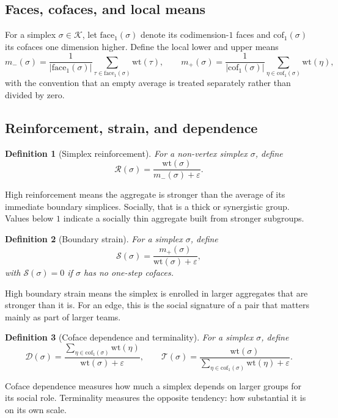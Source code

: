 \documentclass[11pt]{article}
\newtheorem{definition}{Definition}[section]
\newcommand{\eps}{\varepsilon}
\newcommand{\K}{\mathcal{K}}
\newcommand{\wt}{\mathrm{wt}}
\newcommand{\cof}{\mathrm{cof}}
\newcommand{\face}{\mathrm{face}}
\begin{document}
\subsection{Faces, cofaces, and local means}

For a simplex $\sigma \in \K$, let $\face_1(\sigma)$ denote its codimension-$1$ faces and $\cof_1(\sigma)$ its cofaces one dimension higher. Define the local lower and upper means
\[
m_-(\sigma)=
\frac{1}{|\face_1(\sigma)|}
\sum_{\tau \in \face_1(\sigma)} \wt(\tau),
\qquad
m_+(\sigma)=
\frac{1}{|\cof_1(\sigma)|}
\sum_{\eta \in \cof_1(\sigma)} \wt(\eta),
\]
with the convention that an empty average is treated separately rather than divided by zero.

\subsection{Reinforcement, strain, and dependence}

\begin{definition}[Simplex reinforcement]
For a non-vertex simplex $\sigma$, define
\[
\mathcal{R}(\sigma)=\frac{\wt(\sigma)}{m_-(\sigma)+\eps}.
\]
\end{definition}

High reinforcement means the aggregate is stronger than the average of its immediate boundary simplices. Socially, that is a thick or synergistic group. Values below $1$ indicate a socially thin aggregate built from stronger subgroups.

\begin{definition}[Boundary strain]
For a simplex $\sigma$, define
\[
\mathcal{S}(\sigma)=\frac{m_+(\sigma)}{\wt(\sigma)+\eps},
\]
with $\mathcal{S}(\sigma)=0$ if $\sigma$ has no one-step cofaces.
\end{definition}

High boundary strain means the simplex is enrolled in larger aggregates that are stronger than it is. For an edge, this is the social signature of a pair that matters mainly as part of larger teams.

\begin{definition}[Coface dependence and terminality]
For a simplex $\sigma$, define
\[
\mathcal{D}(\sigma)=\frac{\sum_{\eta \in \cof_1(\sigma)} \wt(\eta)}{\wt(\sigma)+\eps},
\qquad
\mathcal{T}(\sigma)=\frac{\wt(\sigma)}{\sum_{\eta \in \cof_1(\sigma)} \wt(\eta)+\eps}.
\]
\end{definition}

Coface dependence measures how much a simplex depends on larger groups for its social role. Terminality measures the opposite tendency: how substantial it is on its own scale.
\end{document}
